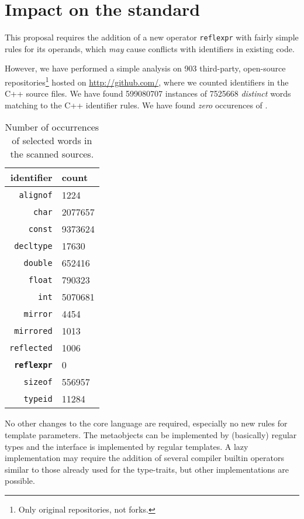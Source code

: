 \section{Impact on the standard}

This proposal requires the addition of a new operator
\texttt{reflexpr} with fairly simple rules for its operands,
which {\em may} cause conflicts with identifiers in existing code.

However, we have performed a simple analysis on \num{903} third-party, open-source
repositories\footnote{Only original repositories, not forks.}
hosted on \url{http://github.com/}, where we counted identifiers
in the C++ source files. We have found \num{599080707} instances of
\num{7525668} {\em distinct} words matching to the C++ identifier rules.
We have found {\em zero} occurences of .

\begin{table}[h]
\centering
\begin{tabular}{|r|l|}
\hline
\textbf{identifier} & \textbf{count} \\\hline
\hline
\texttt{alignof} & \num{1224} \\\hline
\texttt{char} & \num{2077657} \\\hline
\texttt{const} & \num{9373624} \\\hline
\texttt{decltype} & \num{17630} \\\hline
\texttt{double} & \num{652416} \\\hline
\texttt{float} & \num{790323} \\\hline
\texttt{int} & \num{5070681} \\\hline
\texttt{mirror} & \num{4454} \\\hline
\texttt{mirrored} & \num{1013} \\\hline
\texttt{reflected} & \num{1006} \\\hline
\textbf{\texttt{reflexpr}} & \num{0} \\\hline
\texttt{sizeof} & \num{556957} \\\hline
\texttt{typeid} & \num{11284} \\\hline

\end{tabular}
\label{table-identifier-occurences}
\caption{Number of occurrences of selected words in the scanned sources.}
\end{table}


No other changes to the core language are required, especially no new rules
for template parameters. The metaobjects can be implemented by (basically) regular
types and the interface is implemented by regular templates.
A lazy implementation may require the addition of several compiler builtin
operators similar to those already used for the type-traits, but other
implementations are possible.

